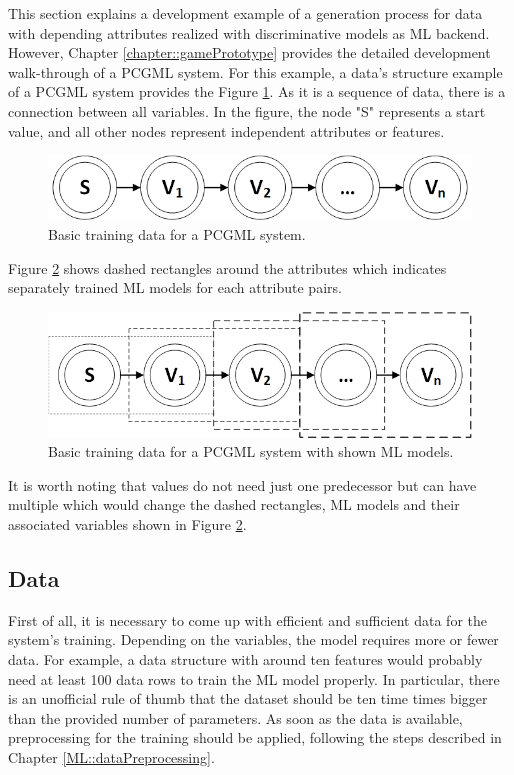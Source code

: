 \documentclass[MGS,Master,english]{twbook}%
\begin{document}
This section explains a development example of a generation process for data with depending attributes realized with discriminative models as \ac{ML} backend. However, Chapter \ref{chapter::gamePrototype} provides the detailed development walk-through of a \ac{PCGML} system. For this example, a data’s structure example of a \ac{PCGML} system provides the Figure \ref{fig::PCGML::devExample::sequenceBase}. As it is a sequence of data, there is a connection between all variables. In the figure, the node "S" represents a start value, and all other nodes represent independent attributes or features. 
\begin{figure}[!htbp]
	\centering
	\includegraphics[width=0.5\linewidth]{PICs/PCGML_development_example_sequence_base}
	\caption{Basic training data for a \ac{PCGML} system. }\label{fig::PCGML::devExample::sequenceBase}
\end{figure}
Figure \ref{fig::PCGML::devExample::sequenceWithModels} shows dashed rectangles around the attributes which indicates separately trained \ac{ML} models for each attribute pairs. 
\begin{figure}[!htbp]
	\centering
	\includegraphics[width=0.55\linewidth]{PICs/PCGML_development_example_sequence_with_models}
	\caption{Basic training data for a \ac{PCGML} system with shown \ac{ML} models.}\label{fig::PCGML::devExample::sequenceWithModels}
\end{figure}
It is worth noting that values do not need just one predecessor but can have multiple which would change the dashed rectangles, \ac{ML} models and their associated variables shown in Figure \ref{fig::PCGML::devExample::sequenceWithModels}.

\subsection{Data}
First of all, it is necessary to come up with efficient and sufficient data for the system’s training. Depending on the variables, the model requires more or fewer data. For example, a data structure with around ten features would probably need at least 100 data rows to train the \ac{ML} model properly. In particular, there is an unofficial rule of thumb that the dataset should be ten time times bigger than the provided number of parameters. As soon as the data is available, preprocessing for the training should be applied, following the steps described in Chapter \ref{ML::dataPreprocessing}.
\end{document}
